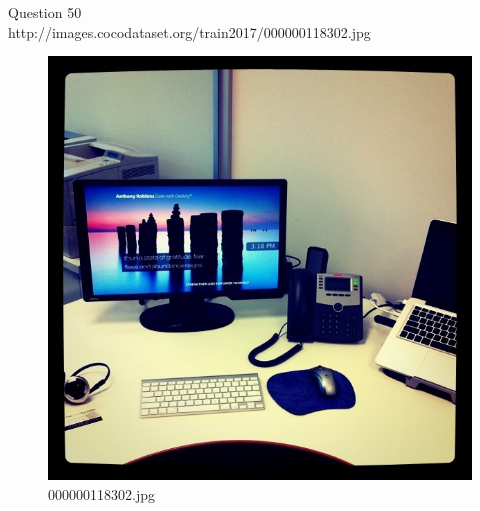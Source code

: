 Question 50\\
http://images.cocodataset.org/train2017/000000118302.jpg
\begin{figure}[h]
    \centering
    \includegraphics[width=0.8\linewidth]{../image set/hard/000000118302.jpg}
    \caption{000000118302.jpg}
\end{figure}
